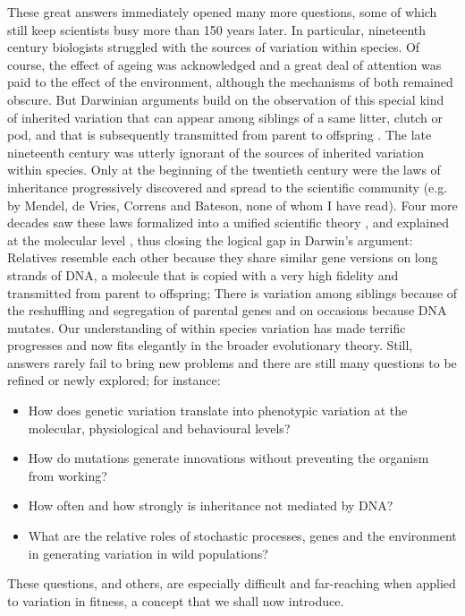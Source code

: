 These great answers immediately opened many more questions, some of which still keep scientists busy more than 150 years later. In particular, nineteenth century biologists struggled with the sources of variation within species. Of course, the effect of ageing was acknowledged and a great deal of attention was paid to the effect of the environment, although the mechanisms of both remained obscure. 
But Darwinian arguments build on the observation of this special kind of inherited variation that can appear among siblings of a same litter, clutch or pod, and that is subsequently transmitted from parent to offspring \parencite[][Chapter 1]{Darwin1859}. The late nineteenth century was utterly ignorant of the sources of inherited variation within species. Only at the beginning of the twentieth century were the laws of inheritance progressively discovered and spread to the scientific community (e.g. by Mendel, de Vries, Correns and Bateson, none of whom I have read). Four more decades saw these laws formalized into a unified scientific theory \parencite{Fisher1930}, and explained at the molecular level \parencite{Oswald1943, Watson1953}, thus closing the logical gap in Darwin's argument: Relatives resemble each other because they share similar gene versions on long strands of DNA, a molecule that is copied with a very high fidelity and transmitted from parent to offspring; There is variation among siblings because of the reshuffling and segregation of parental genes and  on occasions because DNA mutates. 
Our understanding of within species variation has made terrific progresses and now fits elegantly in the broader evolutionary theory. Still, answers rarely fail to bring new problems and there are still many questions to be refined or newly explored; for instance:
\begin{itemize}
\item How does genetic variation translate into phenotypic variation at the molecular, physiological and behavioural levels?\parencite{Kirschner2010}
\item How do mutations generate innovations without preventing the organism from working? \parencite{Wagner2014} 
\item How often and how strongly is inheritance not mediated by DNA? \parencite{Bonduriansky2012}
\item What are the relative roles of stochastic processes, genes and the environment in generating variation in wild populations? \parencite{Raj2008, Postma2014}
\end{itemize}
These questions, and others, are especially difficult and far-reaching when applied to variation in fitness, a concept that we shall now introduce. 

